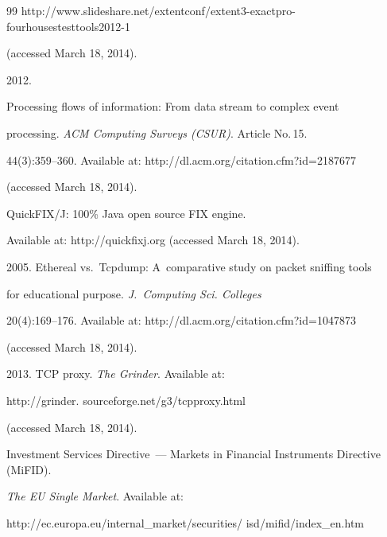 {{\begin{thebibliography}{99}
{http://www.slideshare.net/extentconf/extent3-exactpro-fourhousestesttools2012-1}


(accessed March 18, 2014).







 2012.


Processing flows of information: From data stream to complex event


processing. \textit{ACM Computing Surveys (CSUR)}.  Article No.\,15.


44(3):359--360. Available at: {\sf http://dl.acm.org/citation.cfm?id=2187677}


(accessed March 18, 2014).







QuickFIX/J: 100\% Java open source FIX engine.


Available at: {\sf http://quickfixj.org} (accessed March 18, 2014).









2005. Ethereal vs.\ Tcpdump: A~comparative study on packet sniffing tools


for educational purpose. \textit{J.~Computing Sci. Colleges}


20(4):169--176. Available at: {\sf http://dl.acm.org/citation.cfm?id=1047873}


(accessed March 18, 2014).









2013. TCP proxy. \textit{The Grinder}. Available at: {\sf


http://grinder. sourceforge.net/g3/tcpproxy.html} (accessed March 18, 2014).







Investment Services Directive~--- Markets in Financial Instruments Directive (MiFID).


\textit{The EU Single Market}. Available at:


{\sf http://ec.europa.eu/internal\_market/securities/ isd/mifid/index\_en.htm}



\end{thebibliography}}}
